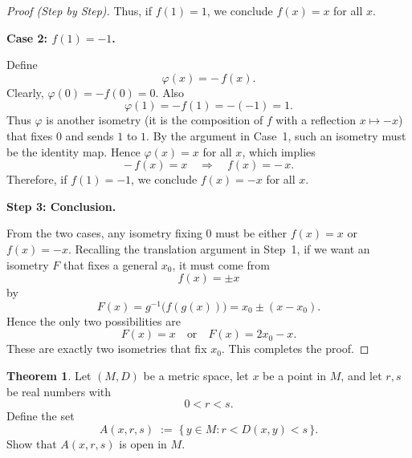 \documentclass[12pt]{article}
\theoremstyle{definition} %
\newtheorem{theorem}{Theorem}
\theoremstyle{plain} %
\begin{document}
\begin{proof}[Proof (Step by Step)]
        Thus, if $f(1)=1$, we conclude $f(x) = x$ for all $x$.  
        
        \medskip
        
        \textbf{Case 2: $f(1) = -1$.}
        
        Define 
        \[
        \varphi(x) = -\,f(x).
        \]
        Clearly, $\varphi(0) = -f(0)=0$.  Also 
        \[
        \varphi(1) = -f(1)= -(-1)=1.
        \]
        Thus $\varphi$ is another isometry (it is the composition of $f$ with a reflection $x \mapsto -x$) that fixes $0$ and sends $1$ to $1$.  By the argument in Case~1, such an isometry must be the identity map.  Hence $\varphi(x)=x$ for all $x$, which implies 
        \[
        -\,f(x) = x 
        \quad\Longrightarrow\quad 
        f(x) = -\,x.
        \]
        Therefore, if $f(1)=-1$, we conclude $f(x) = -x$ for all $x$.  
        
        \medskip
        
        \textbf{Step 3: Conclusion.}
        
        From the two cases, any isometry fixing $0$ must be either $f(x)=x$ or $f(x)=-x$.  
        Recalling the translation argument in Step~1, if we want an isometry $F$ that fixes a general $x_0$, it must come from 
        \[
        f(x) = \pm x
        \]
        by 
        \[
        F(x) = g^{-1}\bigl(f(g(x))\bigr) = x_0 \pm (x - x_0).
        \]
        Hence the only two possibilities are
        \[
        F(x) = x 
        \quad\text{or}\quad 
        F(x) = 2x_0 - x.
        \]
        These are exactly two isometries that fix $x_0$.  This completes the proof.
        \end{proof}
        \begin{theorem}
            Let $(M,D)$ be a metric space, let $x$ be a point in $M$, and let $r,s$ be real numbers with
            \[
            0 < r < s.
            \]
            Define the set 
            \[
            A(x,r,s) \;:=\; \bigl\{\,y \in M : r < D(x,y) < s\,\bigr\}.
            \]
            Show that $A(x,r,s)$ is open in $M$.
            \end{theorem}
            
\end{document}
